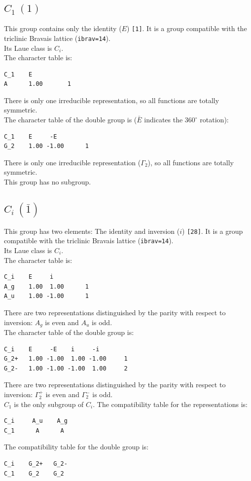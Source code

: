 \documentclass[12pt,a4paper]{article}
\begin{document}
\subsection{\color{web-blue}$C_1\ (1)$}
This group contains only the identity ($E$) \texttt{[1]}. 
It is a group compatible with the triclinic Bravais lattice 
(\texttt{ibrav=14}). \\
Its Laue class is $C_i$. \\
The character table is:
\begin{verbatim}
C_1    E    
A      1.00       1
\end{verbatim}
There is only one irreducible representation, so all functions are 
totally symmetric. \\
The character table of the double group is ($\bar E$ indicates the
$360^\circ$ rotation): 
\begin{verbatim}
C_1    E     -E   
G_2    1.00 -1.00      1
\end{verbatim}
There is only one irreducible representation ($\Gamma_2$), 
so all functions are totally symmetric. \\
This group has no subgroup.

\newpage
\subsection{\color{web-blue}$C_i\ (\bar 1)$}
This group has two elements: The identity and inversion ($i$) \texttt{[28]}.
It is a group compatible with the triclinic Bravais lattice 
(\texttt{ibrav=14}). \\
Its Laue class is $C_i$. \\
The character table is:
\begin{verbatim}
C_i    E     i    
A_g    1.00  1.00      1
A_u    1.00 -1.00      1
\end{verbatim}
There are two representations distinguished by the parity
with respect to inversion: $A_g$ is even and $A_u$ is odd. \\
The character table of the double group is: 
\begin{verbatim}
C_i    E     -E    i     -i   
G_2+   1.00 -1.00  1.00 -1.00     1
G_2-   1.00 -1.00 -1.00  1.00     2
\end{verbatim}
There are two representations distinguished by the parity
with respect to inversion: $\Gamma_2^+$ is even and $\Gamma_2^-$ is odd.\\
$C_1$ is the only subgroup of $C_i$. The compatibility table for the
representations is:
\begin{verbatim}
C_i     A_u    A_g
C_1      A      A
\end{verbatim}
The compatibility table for the double group is:
\begin{verbatim}
C_i    G_2+   G_2- 
C_1    G_2    G_2
\end{verbatim}
\end{document}
